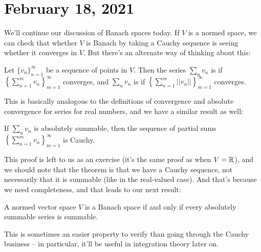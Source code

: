 \pagebreak\section*{February 18, 2021}

We'll continue our discussion of Banach spaces today. If $V$ is a normed space, we can check that whether $V$ is Banach by taking a Cauchy sequence is seeing whether it converges in $V$. But there's an alternate way of thinking about this:

\begin{definition}
Let $\{v_n\}_{n=1}^{\infty}$ be a sequence of points in $V$. Then the series $\sum_{n} v_n$ is  if $\left\{\sum_{n=1}^m v_n\right\}_{m=1}^{\infty}$ converges, and $\sum_n v_n$ is  if $\left\{\sum_{n=1}^m ||v_n||\right\}_{m=1}^{\infty}$ converges.
\end{definition}

This is basically analogous to the definitions of convergence and absolute convergence for series for real numbers, and we have a similar result as well:

\begin{proposition}
If $\sum_n v_n$ is absolutely summable, then the sequence of partial sums $\left\{\sum_{n=1}^m v_n\right\}_{m=1}^{\infty}$ is Cauchy.
\end{proposition}

This proof is left to us as an exercise (it's the same proof as when $V = \mathbb R$), and we should note that the theorem is that we have a Cauchy sequence, not necessarily that it is summable (like in the real-valued case). And that's because we need completeness, and that leads to our next result:

\begin{theorem}\label{summabilitybanach}
A normed vector space $V$ is a Banach space if and only if every absolutely summable series is summable.
\end{theorem}

This is sometimes an easier property to verify than going through the Cauchy business -- in particular, it'll be useful in integration theory later on.

